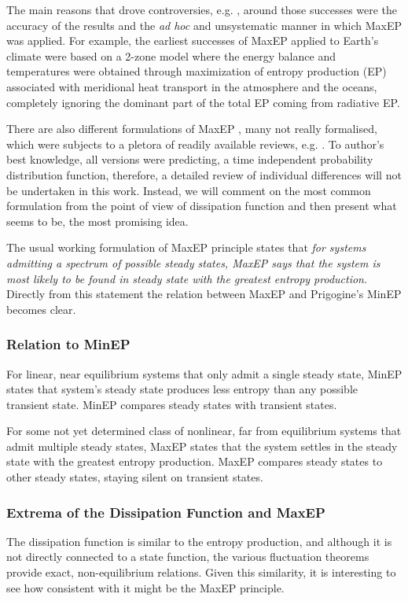 \documentclass[a4paper,12pt]{article}
\begin{document}
The main reasons that drove controversies, e.g. \cite{Goody:2007cv}, around those successes were the accuracy of the results and the \textit{ad hoc} and unsystematic manner in which MaxEP was applied.
For example, the earliest successes of MaxEP applied to Earth's climate were based on a 2-zone model where the energy balance and temperatures were obtained through maximization of entropy production (EP) associated with meridional heat transport in the atmosphere and the oceans, completely ignoring the dominant part of the total EP coming from radiative EP.

There are also different formulations of MaxEP \cite{Virgo:2010it, Zupanovic:2010ea, Kawazura:2010dy, Dewar:2005da}, many not really formalised, which were subjects to a pletora of readily available reviews, e.g. \cite{Bruers:2006us, Zupanovic:2010bv, Dewar:2014ek}. To author's best knowledge, all versions were predicting, a time independent probability distribution function, therefore, a detailed review of individual differences will not be undertaken in this work.
Instead, we will comment on the most common formulation from the point of view of dissipation function and then present what seems to be, the most promising idea.

The usual working formulation of MaxEP  principle states that \textit{for systems admitting a spectrum of possible steady states, MaxEP says that the system is most likely to be found in steady state  with the greatest entropy production}. Directly from this statement the relation between MaxEP and Prigogine's MinEP becomes clear.

\subsubsection{Relation to MinEP}

For linear, near equilibrium systems that only admit a single steady state, MinEP states that system's steady state produces less entropy than any possible transient state.
MinEP compares steady states with transient states.

For some not yet determined class of nonlinear, far from equilibrium systems that admit multiple steady states, MaxEP states that the system settles in the steady state with the greatest entropy production. MaxEP compares steady states to other steady states, staying silent on transient states.

\subsubsection{Extrema of the Dissipation Function and MaxEP}
The dissipation function is similar to the entropy production, and although it is not directly connected to a state function, the various fluctuation theorems provide exact, non-equilibrium relations. Given this similarity, it is interesting to see how consistent with it might be the MaxEP principle. 
\end{document}
